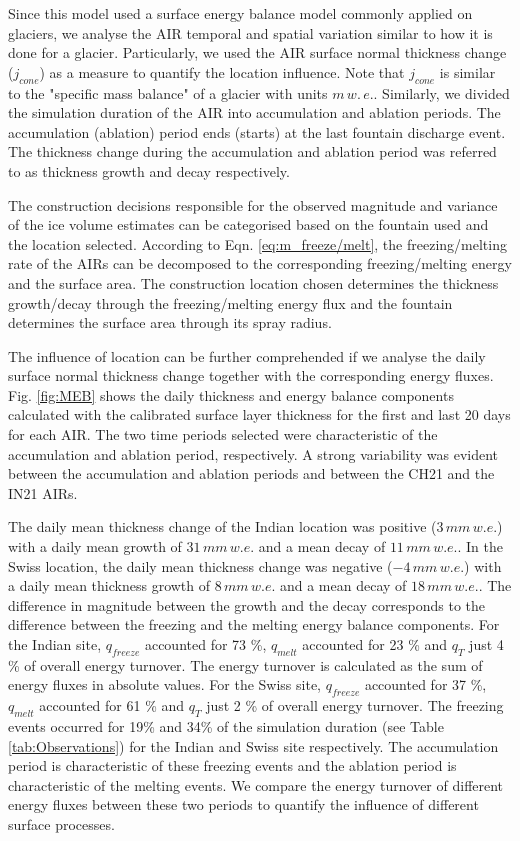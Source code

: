 \documentclass[utf8]{frontiersSCNS}
\begin{document}
Since this model used a surface energy balance model commonly applied on glaciers, we analyse the AIR temporal
and spatial variation similar to how it is done for a glacier. Particularly, we used the AIR surface normal
thickness change ($j_{cone}$) as a measure to quantify the location influence. Note that $j_{cone}$ is similar
to the "specific mass balance" of a glacier with units $m \, w.\, e.$. Similarly, we divided the simulation duration
of the AIR into accumulation and ablation periods. The accumulation (ablation) period ends (starts) at the last
fountain discharge event. The thickness change during the accumulation and ablation period was referred to as
thickness growth and decay respectively.

The construction decisions responsible for the observed magnitude and variance of the ice volume estimates can
be categorised based on the fountain used and the location selected. According to Eqn.  \ref{eq:m_freeze/melt},
the freezing/melting rate of the AIRs can be decomposed to the corresponding freezing/melting energy and the
surface area. The construction location chosen determines the thickness growth/decay through the
freezing/melting energy flux and the fountain determines the surface area through its spray radius.

The influence of location can be further comprehended if we analyse the daily surface normal thickness change
together with the corresponding energy fluxes. Fig. \ref{fig:MEB} shows the daily thickness and energy balance
components calculated with the calibrated surface layer thickness for the first and last 20 days for each AIR. The two time
periods selected were characteristic of the accumulation and ablation period, respectively. A strong variability
was evident between the accumulation and ablation periods and between the CH21 and the IN21 AIRs.

The daily mean thickness change of the Indian location was positive ($3\, mm \,w.e.$) with a daily mean growth
of $31\, mm \,w.e.$ and a mean decay of $11\, mm \,w.e.$. In the Swiss location, the daily mean
thickness change was negative ($-4\, mm \,w.e.$) with a daily mean thickness growth of $8\, mm \,w.e.$ and a
mean decay of $18\, mm \,w.e.$. The difference in magnitude between the growth and the decay corresponds to the
difference between the freezing and the melting energy balance components. For the Indian site, $q_{freeze}$
accounted for 73 \%, $q_{melt}$ accounted for 23 \% and $q_{T}$ just 4 \% of overall energy turnover. The energy
turnover is calculated as the sum of energy fluxes in absolute values. For the Swiss site, $q_{freeze}$
accounted for 37 \%, $q_{melt}$ accounted for 61 \%  and $q_{T}$ just 2 \% of overall energy turnover. The
freezing events occurred for 19\% and 34\% of the simulation duration (see Table \ref{tab:Observations}) for the
Indian and Swiss site respectively. The accumulation period is characteristic of these freezing events and the
ablation period is characteristic of the melting events. We compare the energy turnover of different energy
fluxes between these two periods to quantify the influence of different surface processes.
\end{document}
